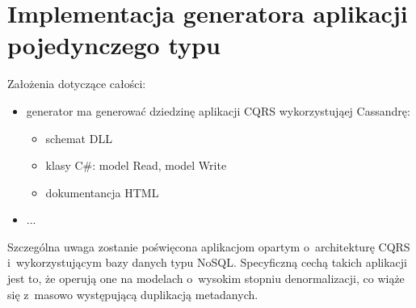 \chapter{Implementacja generatora aplikacji pojedynczego typu} \label{chap:implementation:single_type}

Założenia dotyczące całości:

\begin{itemize}
 \item generator ma generować dziedzinę aplikacji CQRS wykorzystująej Cassandrę:
  \begin{itemize}
   \item schemat DLL
   \item klasy C\#: model Read, model Write
   \item dokumentancja HTML
  \end{itemize}
 \item ...
\end{itemize}

Szczególna uwaga zostanie poświęcona aplikacjom opartym o~architekturę CQRS i~wykorzystującym bazy danych typu NoSQL.
Specyficzną cechą takich aplikacji jest to, że operują one na modelach o~wysokim stopniu denormalizacji, co wiąże się z~masowo występującą duplikacją metadanych.

